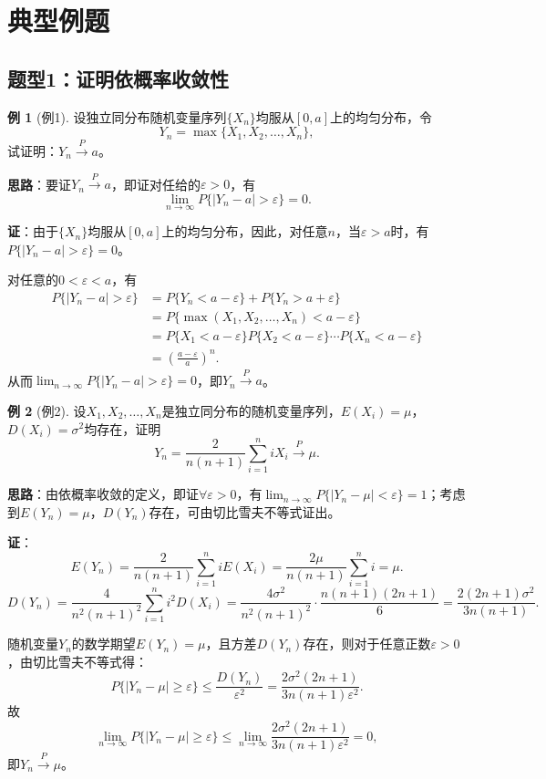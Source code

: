 \documentclass[11pt,a4paper]{report}
\theoremstyle{definition}
\newtheorem{example}{例}[chapter]
\theoremstyle{plain}
\begin{document}
\section{典型例题}

\subsection{题型1：证明依概率收敛性}

\begin{example}[例1]
设独立同分布随机变量序列$\{X_n\}$均服从$[0,a]$上的均匀分布，令
\[
Y_n=\max\{X_1,X_2,\ldots,X_n\},
\]
试证明：$Y_n\stackrel{P}{\longrightarrow}a$。

\textbf{思路}：要证$Y_n\stackrel{P}{\longrightarrow}a$，即证对任给的$\varepsilon>0$，有
\[
\lim_{n\to\infty}P\{|Y_n-a|>\varepsilon\}=0.
\]

\textbf{证}：由于$\{X_n\}$均服从$[0,a]$上的均匀分布，因此，对任意$n$，当$\varepsilon>a$时，有$P\{|Y_n-a|>\varepsilon\}=0$。

对任意的$0<\varepsilon<a$，有
\[
\begin{aligned}
P\{|Y_n-a|>\varepsilon\}
&=P\{Y_n<a-\varepsilon\}+P\{Y_n>a+\varepsilon\}\\
&=P\{\max(X_1,X_2,\ldots,X_n)<a-\varepsilon\}\\
&=P\{X_1<a-\varepsilon\}P\{X_2<a-\varepsilon\}\cdots P\{X_n<a-\varepsilon\}\\
&=\left(\frac{a-\varepsilon}{a}\right)^n.
\end{aligned}
\]
从而$\lim_{n\to\infty}P\{|Y_n-a|>\varepsilon\}=0$，即$Y_n\stackrel{P}{\longrightarrow}a$。
\end{example}

\begin{example}[例2]
设$X_1,X_2,\ldots,X_n$是独立同分布的随机变量序列，$E(X_i)=\mu$，$D(X_i)=\sigma^2$均存在，证明
\[
Y_n=\frac{2}{n(n+1)}\sum_{i=1}^{n}iX_i\stackrel{P}{\longrightarrow}\mu.
\]

\textbf{思路}：由依概率收敛的定义，即证$\forall\varepsilon>0$，有$\lim_{n\to\infty}P\{|Y_n-\mu|<\varepsilon\}=1$；考虑到$E(Y_n)=\mu$，$D(Y_n)$存在，可由切比雪夫不等式证出。

\textbf{证}：
\[
E(Y_n)=\frac{2}{n(n+1)}\sum_{i=1}^{n}iE(X_i)=\frac{2\mu}{n(n+1)}\sum_{i=1}^{n}i=\mu.
\]
\[
D(Y_n)=\frac{4}{n^2(n+1)^2}\sum_{i=1}^{n}i^2D(X_i)=\frac{4\sigma^2}{n^2(n+1)^2}\cdot\frac{n(n+1)(2n+1)}{6}=\frac{2(2n+1)\sigma^2}{3n(n+1)}.
\]

随机变量$Y_n$的数学期望$E(Y_n)=\mu$，且方差$D(Y_n)$存在，则对于任意正数$\varepsilon>0$，由切比雪夫不等式得：
\[
P\{|Y_n-\mu|\geq\varepsilon\}\leq\frac{D(Y_n)}{\varepsilon^2}=\frac{2\sigma^2(2n+1)}{3n(n+1)\varepsilon^2}.
\]
故
\[
\lim_{n\to\infty}P\{|Y_n-\mu|\geq\varepsilon\}\leq\lim_{n\to\infty}\frac{2\sigma^2(2n+1)}{3n(n+1)\varepsilon^2}=0,
\]
即$Y_n\stackrel{P}{\longrightarrow}\mu$。
\end{example}
\end{document}
